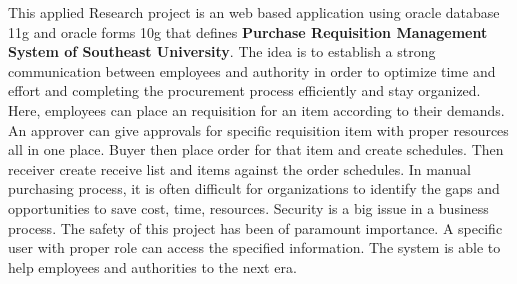 \documentclass[12pt]{report} %
\renewcommand{\footrulewidth}{1pt}
\begin{document}
This applied Research project is an web based application using oracle database 11g and oracle forms 10g that defines \textbf{Purchase Requisition Management System of Southeast University}. The idea is to establish a strong communication between employees and authority in order to optimize time and effort and completing the procurement process efficiently and stay organized. Here, employees can place an requisition for an item according to their demands. An approver can give approvals for specific requisition item with proper resources all in one place. Buyer then place order for that item and create schedules. Then receiver create receive list and items against the order schedules. In manual purchasing process, it is often difficult for organizations to identify the gaps and opportunities to save cost, time, resources. Security is a big issue in a business process. The safety of this project has been of paramount importance. A specific user with proper role can access the specified information. The system is able to help employees and authorities to the next era.




\clearpage

















{}













\thispagestyle{empty}
\tableofcontents
\thispagestyle{empty}

\end{document}

